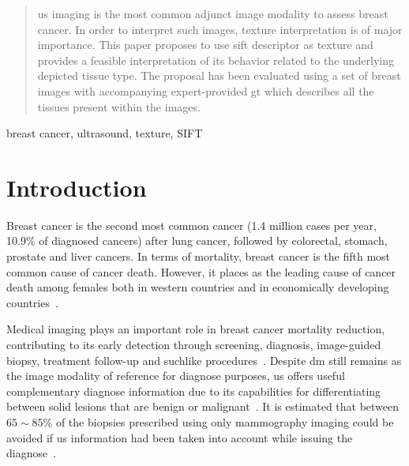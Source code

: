 \documentclass[a4paper, 10pt, conference]{llncs}      %
\begin{document}
\vspace{-5pt}
\begin{abstract}
\ac{us} imaging is the most common adjunct image modality to assess breast cancer. In order to interpret such images, texture interpretation is of major importance. This paper proposes to use \acf{sift} descriptor as texture and provides a feasible interpretation of its behavior related to the underlying depicted tissue type. The proposal has been evaluated using a set of breast images with accompanying expert-provided \acf{gt} which describes all the tissues present within the images.
\end{abstract}
%
\begin{keywords}
breast cancer, ultrasound, texture, SIFT
\end{keywords}
%

\graphicspath{{figures/}}

\section{Introduction}
\label{sec:introduction}
 
Breast cancer is the second most common cancer (1.4 million cases per year, 10.9\% of  diagnosed cancers) after lung cancer, followed by colorectal, stomach, prostate and liver cancers. 
In terms of mortality, breast cancer is the fifth most common cause of cancer death. However, it places as the leading cause of cancer death among females both in western countries and in economically developing countries~\cite{cancerStatistics2011}.

Medical imaging plays an important role in breast cancer mortality reduction, contributing to its early detection through screening, diagnosis, image-guided biopsy, treatment follow-up and suchlike procedures~\cite{smith2003american}.
Despite \ac{dm} still remains as the image modality of reference for diagnose purposes, \ac{us} offers useful complementary  diagnose information due to its capabilities for differentiating between solid lesions that are benign or malignant~\cite{stavros2004breast}. It is estimated that between $65\sim85\%$ of the biopsies prescribed using only mammography imaging could be avoided if \ac{us} information had been taken into account while issuing the diagnose~\cite{yuan2010multimodality}. 
\end{document}
